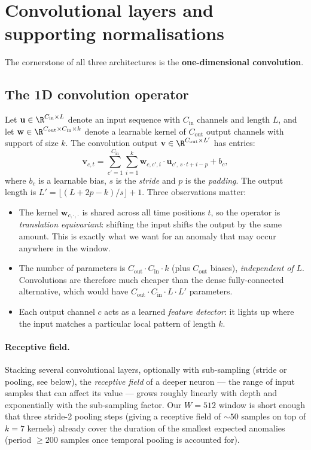 \section{Convolutional layers and supporting normalisations}
\label{sec:cnn-theory}

The cornerstone of all three architectures is the
\textbf{one-dimensional convolution}.

\subsection{The 1D convolution operator}
\label{sec:conv-theory}

Let $\mathbf{u} \in \R^{C_{\text{in}} \times L}$ denote an input
sequence with $C_{\text{in}}$ channels and length $L$, and let
$\mathbf{w} \in \R^{C_{\text{out}} \times C_{\text{in}} \times k}$
denote a learnable kernel of $C_{\text{out}}$ output channels with
support of size $k$. The convolution output
$\mathbf{v} \in \R^{C_{\text{out}} \times L'}$ has entries:
\begin{equation}
    \mathbf{v}_{c, t} = \sum_{c'=1}^{C_{\text{in}}} \sum_{i=1}^{k}
        \mathbf{w}_{c, c', i} \cdot \mathbf{u}_{c', \, s \cdot t + i - p} + b_c,
    \label{eq:conv}
\end{equation}
where $b_c$ is a learnable bias, $s$ is the \emph{stride} and $p$ is the
\emph{padding}. The output length is
$L' = \lfloor (L + 2p - k)/s \rfloor + 1$. Three observations matter:
\begin{itemize}[leftmargin=*, itemsep=0.2em]
    \item The kernel $\mathbf{w}_{c, \cdot, \cdot}$ is shared across all
    time positions $t$, so the operator is \emph{translation
    equivariant}: shifting the input shifts the output by the same
    amount. This is exactly what we want for an anomaly that may occur
    anywhere in the window.
    \item The number of parameters is $C_{\text{out}} \cdot C_{\text{in}} \cdot k$
    (plus $C_{\text{out}}$ biases), \emph{independent of} $L$. Convolutions
    are therefore much cheaper than the dense fully-connected
    alternative, which would have $C_{\text{out}} \cdot C_{\text{in}} \cdot L \cdot L'$
    parameters.
    \item Each output channel $c$ acts as a learned \emph{feature
    detector}: it lights up where the input matches a particular local
    pattern of length $k$.
\end{itemize}

\paragraph{Receptive field.}
Stacking several convolutional layers, optionally with sub-sampling
(stride or pooling, see below), the \emph{receptive field} of a deeper
neuron --- the range of input samples that can affect its value ---
grows roughly linearly with depth and exponentially with the
sub-sampling factor. Our $W=512$ window is short enough that three
stride-2 pooling steps (giving a receptive field of $\sim 50$ samples on
top of $k=7$ kernels) already cover the duration of the smallest
expected anomalies (period $\geq 200$ samples once temporal pooling is
accounted for).

